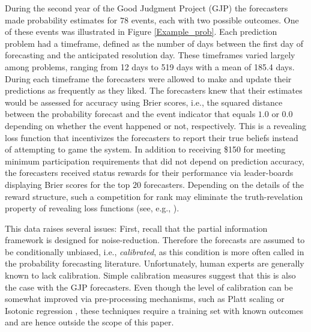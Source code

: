 \documentclass[11pt]{article}
\theoremstyle{definition}
\theoremstyle{definition}
\begin{document}
% 
During the second year of the Good Judgment Project (GJP) the forecasters made probability estimates for $78$ events, each with two possible outcomes. One of these events was illustrated in Figure \ref{Example_prob}. %
Each prediction problem had a timeframe, defined as the number of days between the first day of forecasting and the anticipated resolution day. 
These timeframes varied largely among problems, ranging from 12 days to 519 days with a mean of 185.4 days.
% 
During each timeframe the forecasters were allowed to make and update their predictions as frequently as they liked.  The forecasters knew that their estimates would be assessed for accuracy using Brier scores, i.e., the squared distance between the probability forecast and the event indicator that equals $1.0$ or $0.0$ depending on whether the event happened or not, respectively. This is a revealing loss function that incentivizes the forecasters to report their true beliefs instead of attempting to game the system. In addition to receiving \$150 for meeting minimum participation requirements that did not depend on prediction accuracy, the forecasters received status rewards for their performance via leader-boards displaying Brier scores for the top $20$ forecasters. Depending on the details of the reward structure, such a competition for rank may eliminate the truth-revelation property of revealing loss functions (see, e.g., \citealt{lichtendahl2007probability}).


This data raises several issues: First, recall that the partial information framework is designed for noise-reduction. Therefore the forecasts are assumed to be conditionally unbiased, i.e., \textit{calibrated}, as this condition is more often called in the probability forecasting literature. Unfortunately, human experts are generally known to lack calibration. Simple calibration measures suggest that this is also the case with the GJP forecasters. Even though the level of calibration can be somewhat improved via pre-processing mechanisms, such as Platt scaling \citep{platt1999probabilistic} or Isotonic regression \citep{zadrozny2001obtaining}, these techniques require a training set with known outcomes and are hence outside the scope of this paper. 
\end{document}
